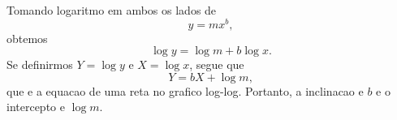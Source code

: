 Tomando logaritmo em ambos os lados de
\[
y = m x^b,
\]
obtemos
\[
\log y = \log m + b\log x.
\]
Se definirmos $Y=\log y$ e $X=\log x$, segue que
\[
Y = bX + \log m,
\]
que e a equacao de uma reta no grafico log-log. Portanto, a inclinacao e $b$ e o intercepto e $\log m$.

